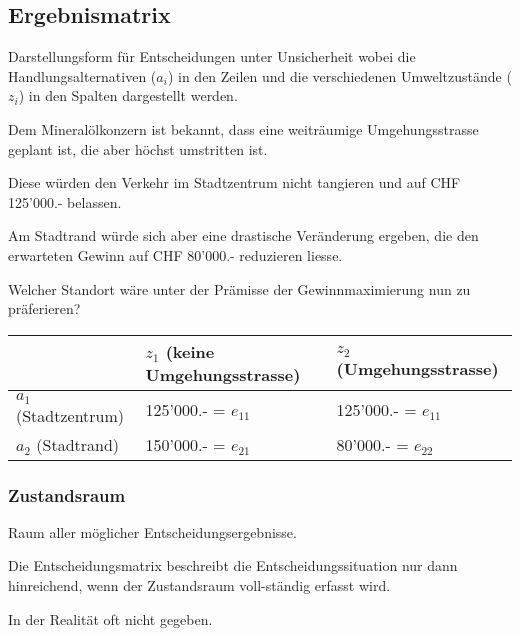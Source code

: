 \subsection{Ergebnismatrix}
Darstellungsform für Entscheidungen unter Unsicherheit wobei die Handlungsalternativen ($a_i$) in den Zeilen und die verschiedenen Umweltzustände ($z_i$) in den Spalten dargestellt werden. 
\begin{example}
	Dem Mineralölkonzern ist bekannt, dass eine weiträumige Umgehungsstrasse geplant ist, die aber höchst umstritten ist.
	\begin{compactitem}
		\item Diese würden den Verkehr im Stadtzentrum nicht tangieren und auf CHF 125'000.- belassen.
		\item Am Stadtrand würde sich aber eine drastische Veränderung ergeben,	die den erwarteten Gewinn auf CHF 80'000.- reduzieren liesse.
	\end{compactitem}
	Welcher Standort wäre unter der Prämisse der Gewinnmaximierung nun zu präferieren? \\
	\begin{tabular}{|l|l|l|}
		\hline
		& $z_1$ (keine Umgehungsstrasse) & $z_2$ (Umgehungsstrasse) \\ \hline
		$a_1$ (Stadtzentrum) & 125'000.- = $e_{11}$ & 125'000.- = $e_{11}$ \\ \hline
		$a_2$ (Stadtrand) & 150'000.- = $e_{21}$ & 80'000.- = $e_{22}$ \\ \hline
	\end{tabular}
\end{example}

\subsubsection{Zustandsraum}
\begin{compactitem}
	\item Raum aller möglicher Entscheidungsergebnisse.
	\item Die Entscheidungsmatrix beschreibt die Entscheidungssituation nur dann hinreichend, wenn der Zustandsraum voll-ständig erfasst wird.
	\item In der Realität oft nicht gegeben.
\end{compactitem}

